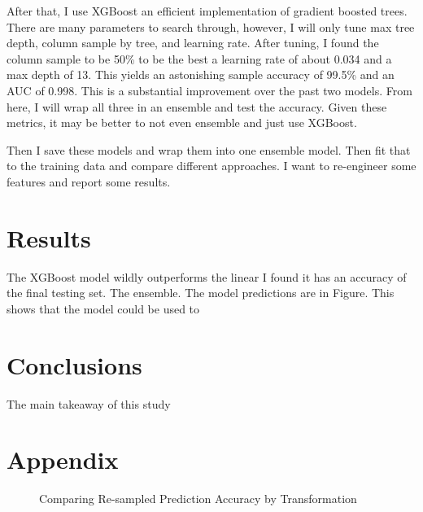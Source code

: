 \documentclass[16pt,twocolumn,letterpaper,titlepage]{article}
\begin{document}
After that, I use XGBoost \cite{Chen2016} an efficient implementation of gradient boosted trees. There are many parameters to search through, however, I will only tune max tree depth, column sample by tree, and learning rate. After tuning, I found the column sample to be 50\% to be the best a learning rate of about 0.034 and a max depth of 13. This yields an astonishing sample accuracy of 99.5\% and an AUC of 0.998. This is a substantial improvement over the past two models. From here, I will wrap all three in an ensemble and test the accuracy. Given these metrics, it may be better to not even ensemble and just use XGBoost. 

Then I save these models and wrap them into one ensemble model. Then fit that to the training data and compare different approaches. I want to re-engineer some features and report some results. 


\section{Results}

The XGBoost model wildly outperforms the linear I found it has an accuracy of the final testing set. The ensemble. The model predictions are in Figure. This shows that the model could be used to 

\section{Conclusions}

The main takeaway of this study 

\clearpage
\onecolumn



\section{Appendix}

\begin{figure}[!htb]
	\caption{\label{fig:my-label} Comparing Re-sampled Prediction Accuracy by Transformation}
	
\end{figure}
\end{document}
